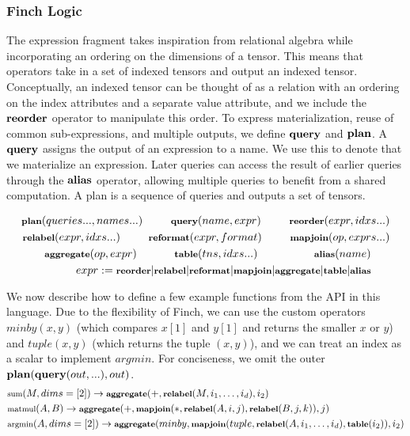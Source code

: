 \subsubsection{Finch Logic}
The expression fragment takes inspiration from relational algebra while incorporating an ordering on the dimensions of a tensor. This means that operators take in a set of indexed tensors and output an indexed tensor. Conceptually, an indexed tensor can be thought of as a relation with an ordering on the index attributes and a separate value attribute, and we include the $\text{\textbf{reorder}}$ operator to manipulate this order. To express materialization, reuse of common sub-expressions, and multiple outputs, we define $\text{\textbf{query}}$ and $\text{\textbf{plan}}$. A $\text{\textbf{query}}$ assigns the output of an expression to a name. We use this to denote that we materialize an expression. Later queries can access the result of earlier queries through the $\text{\textbf{alias}}$ operator, allowing multiple queries to benefit from a shared computation. A plan is a sequence of queries and outputs a set of tensors. 

\begin{align*}
    \footnotesize \text{\textbf{plan}}(queries..., names...) \quad\quad\quad \text{\textbf{query}}(name, expr) \quad\quad\quad \text{\textbf{reorder}}(expr, idxs...)\\
     \footnotesize \text{\textbf{relabel}}(expr, idxs...) \quad\quad\quad \text{\textbf{reformat}}(expr, format) \quad\quad\quad \text{\textbf{mapjoin}}(op, exprs...) \\
    \footnotesize\text{\textbf{aggregate}}(op, expr)\quad\quad\quad\quad \text{\textbf{table}}(tns, idxs...)  \quad\quad\quad\quad\quad\quad \text{\textbf{alias}}(name) \quad\quad\\
     \footnotesize expr:= \text{\textbf{reorder}} | \text{\textbf{relabel}} | \text{\textbf{reformat}} |\text{\textbf{mapjoin}} | \text{\textbf{aggregate}} | \text{\textbf{table}} | \text{\textbf{alias}} \quad\quad
\end{align*}

We now describe how to define a few example functions from the API in this language. Due to the flexibility of Finch, we can use the custom operators $minby(x,y)$ (which compares $x[1]$ and $y[1]$ and returns the smaller $x$ or $y$) and $tuple(x, y)$ (which returns the tuple $(x,y)$), and we can treat an index as a scalar to implement $argmin$. For conciseness, we omit the outer $\text{\textbf{plan}}(\text{\textbf{query}}(out,...),out)$.
\begin{align*}
&\footnotesize \text{sum}(M, dims=[2]) \rightarrow \text{\textbf{aggregate}}(+,\text{\textbf{relabel}}(M, i_1,\ldots,i_d), i_2)\\
&\footnotesize \text{matmul}(A, B) \rightarrow \text{\textbf{aggregate}}(+,\text{\textbf{mapjoin}}(*, \text{\textbf{relabel}}(A, i, j), \text{\textbf{relabel}}(B, j, k)), j)\\
&\footnotesize \text{argmin}(A, dims=[2]) \rightarrow \text{\textbf{aggregate}}(minby,\text{\textbf{mapjoin}}(tuple, \text{\textbf{relabel}}(A, i_1,\ldots,i_d), \text{\textbf{table}}(i_2)), i_2)
\end{align*}


